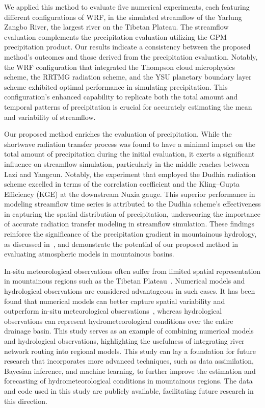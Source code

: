 \documentclass[draft]{agujournal2019}
\begin{document}
We applied this method to evaluate five numerical experiments, each featuring different configurations of WRF, in the simulated streamflow of the Yarlung Zangbo River, the largest river on the Tibetan Plateau. The streamflow evaluation complements the precipitation evaluation utilizing the GPM precipitation product. Our results indicate a consistency between the proposed method's outcomes and those derived from the precipitation evaluation. Notably, the WRF configuration that integrated the Thompson cloud microphysics scheme, the RRTMG radiation scheme, and the YSU planetary boundary layer scheme exhibited optimal performance in simulating precipitation. This configuration's enhanced capability to replicate both the total amount and temporal patterns of precipitation is crucial for accurately estimating the mean and variability of streamflow.

Our proposed method enriches the evaluation of precipitation. While the shortwave radiation transfer process was found to have a minimal impact on the total amount of precipitation during the initial evaluation, it exerts a significant influence on streamflow simulation, particularly in the middle reaches between Lazi and Yangcun. Notably, the experiment that employed the Dudhia radiation scheme excelled in terms of the correlation coefficient and the Kling--Gupta Efficiency (KGE) at the downstream Nuxia gauge. This superior performance in modeling streamflow time series is attributed to the Dudhia scheme's effectiveness in capturing the spatial distribution of precipitation, underscoring the importance of accurate radiation transfer modeling in streamflow simulation. These findings reinforce the significance of the precipitation gradient in mountainous hydrology, as discussed in~\cite{immerzeel2014WRR}, and demonstrate the potential of our proposed method in evaluating atmospheric models in mountainous basins.

In-situ meteorological observations often suffer from limited spatial representation in mountainous regions such as the Tibetan Plateau~\cite{miao2024PNAS}. Numerical models and hydrological observations are considered advantageous in such cases. It has been found that numerical models can better capture spatial variability and outperform in-situ meteorological observations~\cite{lundquist2019BAMS}, whereas hydrological observations can represent hydrometeorological conditions over the entire drainage basin. This study serves as an example of combining numerical models and hydrological observations, highlighting the usefulness of integrating river network routing into regional models. This study can lay a foundation for future research that incorporates more advanced techniques, such as data assimilation, Bayesian inference, and machine learning, to further improve the estimation and forecasting of hydrometeorological conditions in mountainous regions. The data and code used in this study are publicly available, facilitating future research in this direction.
\end{document}
